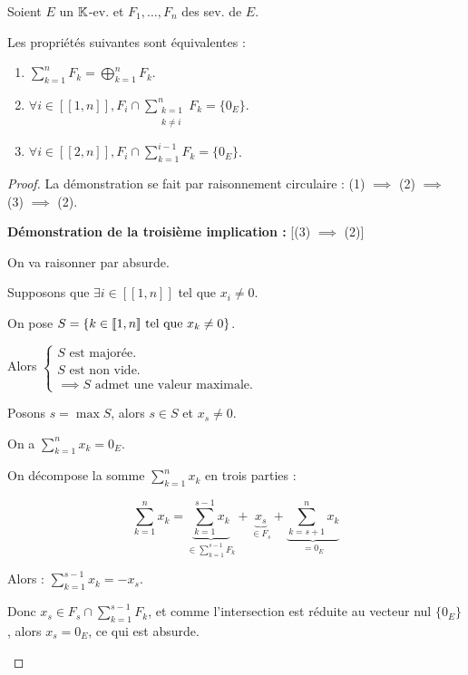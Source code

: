 \documentclass[12pt, a4paper]{report}
\begin{document}
\begin{property}
    Soient $E$ un $\mathbb{K}$-ev. et $F_1,\dots,F_n$ des sev. de $E$.

    Les propriétés suivantes sont équivalentes :

    \begin{enumerate}
        \item $\sum_{k=1}^n F_k = \bigoplus_{k=1}^n F_k$.
        \item $\forall i \in [\![1,n]\!], F_i \cap \sum_{\substack{k=1 \\ k \ne i}}^n F_k = \{0_E\}$.
        \item $\forall i \in [\![2,n]\!], F_i \cap \sum_{k=1}^{i-1} F_k = \{0_E\}$.
    \end{enumerate}
\end{property}

\begin{proof}
    La démonstration se fait par raisonnement circulaire : (1) $\implies$ (2) $\implies$ (3) $\implies$ (2).

    \begin{outline}

        \1 \textbf{Démonstration de la troisième implication :} [(3) $\implies$ (2)]

        On va raisonner par absurde.

        Supposons que $\exists i \in [\![1,n]\!]$ tel que $x_i \ne 0$.


        On pose $S = \{ k \in [\![1,n]\!] \text{ tel que } x_k \ne 0\}$.


        Alors $\begin{cases}
            S \text{ est majorée.}\\
            S \text{ est non vide.}\\
            \implies S \text{ admet une valeur maximale.}
        \end{cases}$

        Posons $s = \max S$, alors $s \in S$ et $x_s \ne 0$.
        
        On a $\sum_{k=1}^n x_k = 0_E$.

        On décompose la somme $\sum_{k=1}^n x_k$ en trois parties :
        
        $$\sum_{k=1}^n x_k = \underbrace{\sum_{k=1}^{s-1} x_k}_{\in \sum_{k=1}^{s-1} F_k} + \underbrace{x_s}_{\in F_s} + \underbrace{\sum_{k=s+1}^n x_k}_{= 0_E}$$

        Alors : $\sum_{k=1}^{s-1} x_k = -x_s$.

        Donc $x_s \in F_s \cap \sum_{k=1}^{s-1} F_k$, et comme l'intersection est réduite au vecteur nul $\{0_E\}$, alors $x_s = 0_E$, ce qui est absurde.
    \end{outline}
\end{proof}
\end{document}
